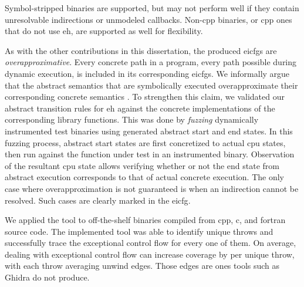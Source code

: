 Symbol-stripped binaries are supported, but may not perform well if they contain unresolvable indirections or unmodeled callbacks.
Non-\gls{cpp} binaries, or \gls{cpp} ones that do not use \gls{eh}, are supported as well for flexibility.

As with the other contributions in this dissertation, the produced \glspl{eicfg} are \emph{overapproximative}.
Every concrete path in a program, every path possible during dynamic execution, is included in its corresponding \glspl{eicfg}.
We informally argue that the abstract semantics that are symbolically executed overapproximate their corresponding concrete semantics \autocite{cousot1996abstract}.
To strengthen this claim, we validated our abstract transition rules for \gls{eh} against the concrete implementations of the corresponding library functions.
This was done by \emph{fuzzing} dynamically instrumented test binaries using generated abstract start and end states.
In this fuzzing process, abstract start states are first concretized to actual \gls{cpu} states, then run against the function under test in an instrumented binary.
Observation of the resultant \gls{cpu} state allows verifying whether or not the end state from abstract execution corresponds to that of actual concrete execution.
The only case where overapproximation is not guaranteed is when an indirection cannot be resolved.
Such cases are clearly marked in the \gls{eicfg}.

We applied the tool to  off-the-shelf binaries compiled from \gls{cpp}, \gls{c}, and \gls{fortran} source code.
The implemented tool was able to identify  unique throws and successfully trace the exceptional control flow for every one of them.
On average, dealing with exceptional control flow can increase coverage by  per unique throw, with each throw averaging  unwind edges.
Those edges are ones tools such as Ghidra \autocite{ghidra} do not produce.

